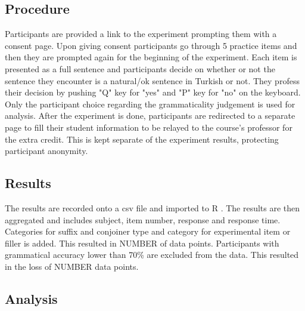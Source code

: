 \subsection{Procedure}
Participants are provided a link to the experiment prompting them with a consent page. Upon giving consent participants go through 5 practice items and then they are prompted again for the beginning of the experiment. Each item is presented as a full sentence and participants decide on whether or not the sentence they encounter is a natural/ok sentence in Turkish or not. They profess their decision by pushing "Q" key for "yes" and "P" key for "no" on the keyboard. Only the participant choice regarding the grammaticality judgement is used for analysis. After the experiment is done, participants are redirected to a separate page to fill their student information to be relayed to the course's professor for the extra credit. This is kept separate of the experiment results, protecting participant anonymity.

\subsection{Results}

The results are recorded onto a csv file and imported to R \citep{team2013r}. The results are then aggregated and includes subject, item number, response and response time. Categories for suffix and conjoiner type and category for experimental item or filler is added. This resulted in NUMBER of data points. Participants with grammatical accuracy lower than 70\% are excluded from the data. This resulted in the loss of NUMBER data points.


\subsection{Analysis}



